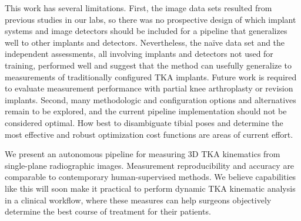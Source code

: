 This work has several limitations. First, the image data sets resulted from previous studies in our labs, so there was no prospective design of which implant systems and image detectors should be included for a pipeline that generalizes well to other implants and detectors. Nevertheless, the naïve data set and the independent assessments, all involving implants and detectors not used for training, performed well and suggest that the method can usefully generalize to measurements of traditionally configured TKA implants. Future work is required to evaluate measurement performance with partial knee arthroplasty or revision implants. Second, many methodologic and configuration options and alternatives remain to be explored, and the current pipeline implementation should not be considered optimal. How best to disambiguate tibial poses and determine the most effective and robust optimization cost functions are areas of current effort.

We present an autonomous pipeline for measuring 3D TKA kinematics from single-plane radiographic images. Measurement reproducibility and accuracy are comparable to contemporary human-supervised methods. We believe capabilities like this will soon make it practical to perform dynamic TKA kinematic analysis in a clinical workflow, where these measures can help surgeons objectively determine the best course of treatment for their patients.

